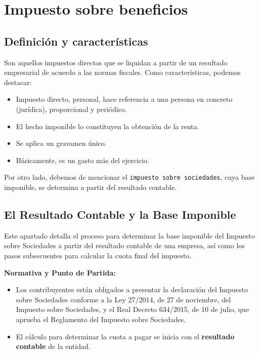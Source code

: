\documentclass[
  paper=a4,
  ,captions=tableheading
]{scrbook}
\providecommand{\tightlist}{%
  \setlength{\itemsep}{0pt}\setlength{\parskip}{0pt}}
\begin{document}
\hypertarget{impuesto-sobre-beneficios}{%
\chapter{Impuesto sobre beneficios}\label{impuesto-sobre-beneficios}}

\hypertarget{definiciuxf3n-y-caracteruxedsticas}{%
\section{Definición y
características}\label{definiciuxf3n-y-caracteruxedsticas}}

Son aquellos impuestos directos que se liquidan a partir de un resultado
empresarial de acuerdo a las normas fiscales. Como características,
podemos destacar:

\begin{itemize}
\tightlist
\item
  Impuesto directo, personal, hace referencia a una persona en concreto
  (jurídica), proporcional y periódico.
\item
  El hecho imponible lo constituyen la obtención de la renta.
\item
  Se aplica un gravamen único.
\item
  Básicamente, es un gasto más del ejercicio.
\end{itemize}

Por otro lado, debemos de mencionar el
\texttt{impuesto\ sobre\ sociedades}, cuya base imponible, se determina
a partir del resultado contable.

\hypertarget{el-resultado-contable-y-la-base-imponible}{%
\section{El Resultado Contable y la Base
Imponible}\label{el-resultado-contable-y-la-base-imponible}}

Este apartado detalla el proceso para determinar la base imponible del
Impuesto sobre Sociedades a partir del resultado contable de una
empresa, así como los pasos subsecuentes para calcular la cuota final
del impuesto.

\textbf{Normativa y Punto de Partida:}

\begin{itemize}
\tightlist
\item
  Los contribuyentes están obligados a presentar la declaración del
  Impuesto sobre Sociedades conforme a la Ley 27/2014, de 27 de
  noviembre, del Impuesto sobre Sociedades, y el Real Decreto 634/2015,
  de 10 de julio, que aprueba el Reglamento del Impuesto sobre
  Sociedades.
\item
  El cálculo para determinar la cuota a pagar se inicia con el
  \textbf{resultado contable} de la entidad.
\end{itemize}
\end{document}
